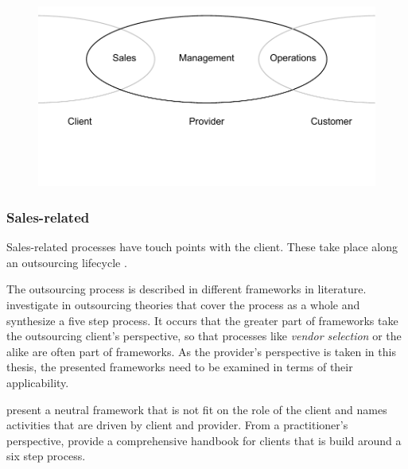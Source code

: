 	
	\begin{figure}[caption={BPO Chain Provider Scope with Stakeholders}, label={fig:bpochainscope}]
		{	\includegraphics[width=.8\textwidth]{figures/chain2.pdf}}
	\end{figure} 
	
	\subsubsection{Sales-related}
	\label{sec:srproc}
	Sales-related processes have touch points with the client. These take place along an outsourcing lifecycle \citep{Babin_2016}.
	
	The outsourcing process is described in different frameworks in literature. \cite{perunovic2007outsourcing} investigate in outsourcing theories that cover the process as a whole and synthesize a five step process. It occurs that the greater part of frameworks take the outsourcing client's perspective, so that processes like \textit{vendor selection} or the alike are often part of frameworks. As the provider's perspective is taken in this thesis, the presented frameworks need to be examined in terms of their applicability.
	
	\cite{Agarwal_2008} present a neutral framework that is not fit on the role of the client and names activities that are driven by client and provider. From a practitioner's perspective, \cite{deloittehandbook} provide a comprehensive handbook for clients that is build around a six step process. 
	
	
	
